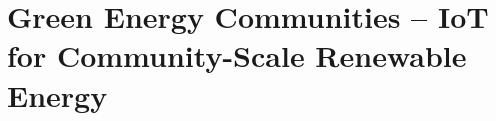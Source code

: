\part[nopartpage]{Green Energy Communities -- IoT for Community-Scale Renewable Energy}
\withpartpage
